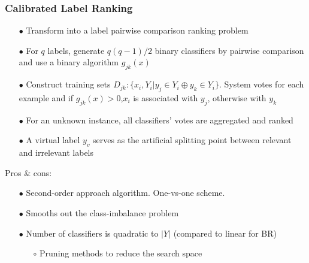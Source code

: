 \documentclass{beamer}
\begin{document}
\begin{frame}
\frametitle{Calibrated Label Ranking}
\begin{itemize}
\item[$\bullet$] Transform into a label pairwise comparison ranking problem
\item[$\bullet$] For $q$ labels, generate $q(q-1)/2$ binary classifiers by pairwise comparison and use a binary algorithm $g_{jk}(x)$
\item[$\bullet$] Construct training sets $D_{jk} : \{x_i, Y_i | y_j \in Y_i \oplus y_k \in Y_i\}$. System votes for each example and if $g_{jk}(x) >0$,$x_i$ is associated with $y_j$, otherwise with $y_k$
\item[$\bullet$] For an unknown instance, all classifiers' votes are aggregated and ranked
\item[$\bullet$] A virtual label $y_v$ serves as the artificial splitting point between relevant and irrelevant labels
\end{itemize}
Pros \& cons:
\begin{itemize}
\item[$\bullet$] Second-order approach algorithm. One-vs-one scheme.
\item[$\bullet$] Smooths out the class-imbalance problem
\item[$\bullet$] Number of classifiers is quadratic to $|Y|$ (compared to linear for BR)
\begin{itemize}
\item[$\circ$] Pruning methods to reduce the search space
\end{itemize}
\end{itemize}
\end{frame}
\end{document}
